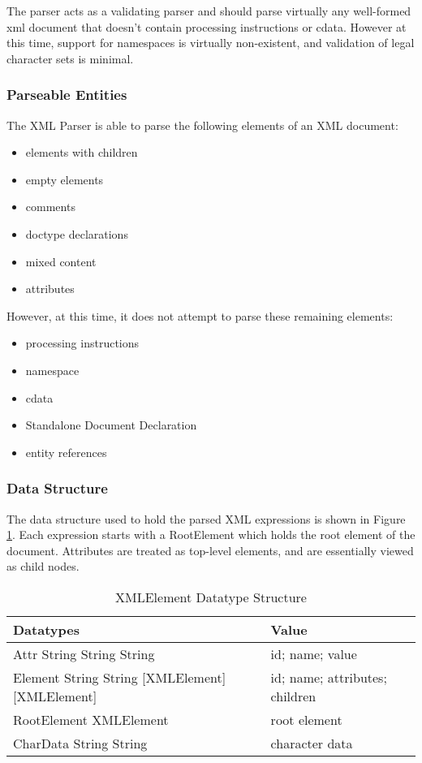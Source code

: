 \documentclass{acm_proc_article-sp}
\begin{document}
The parser acts as a validating parser and should parse virtually any well-formed xml document that doesn't contain processing instructions or cdata.  However at this time, support for namespaces is virtually non-existent, and validation of legal character sets is minimal.

\subsubsection{Parseable Entities}
The XML Parser is able to parse the following elements of an XML document:
\begin{itemize}
	\item elements with children
	\item empty elements
	\item comments
	\item doctype declarations
	\item mixed content
	\item attributes
	\end{itemize}

However, at this time, it does not attempt to parse these remaining elements:
\begin{itemize}
	\item processing instructions
	\item namespace
	\item cdata
	\item Standalone Document Declaration
	\item entity references
\end{itemize}

\subsubsection{Data Structure}
The data structure used to hold the parsed XML expressions is shown in Figure \ref{xmldata}.  Each expression starts with a RootElement which holds the root element of the document.  Attributes are treated as top-level elements, and are essentially viewed as child nodes.  

\begin{table}[!htpb]
\caption{XMLElement Datatype Structure}
\label{xmldata}
\centering
\begin{tabular*}{.46\textwidth}{|p{} | p{}|}
\hline
\textbf{Datatypes}																			&	\textbf{Value} \\
\hline Attr String String String														& id; name; value \\
\hline Element String String [XMLElement] [XMLElement]	& id; name; attributes; children \\
\hline RootElement XMLElement												& root element \\
\hline CharData String String														& character data \\
\hline 
\end{tabular*}
\end{table}
\end{document}

